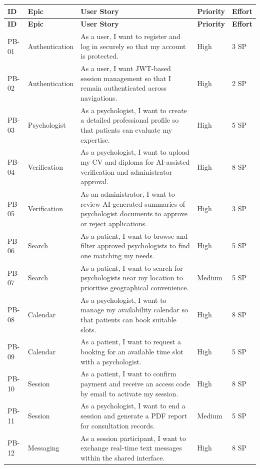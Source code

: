 \documentclass[a4paper,12pt]{report}
\begin{document}
\footnotesize
\begin{longtable}{@{} L{1.1cm} L{2.7cm} L{7.2cm} L{1.8cm} L{1.6cm} @{}}
\toprule
\bfseries ID &
\bfseries Epic &
\bfseries User Story &
\bfseries Priority &
\bfseries Effort \\
\midrule
\endfirsthead
\toprule
\bfseries ID &
\bfseries Epic &
\bfseries User Story &
\bfseries Priority &
\bfseries Effort \\
\midrule
\endhead

PB-01 & Authentication & As a user, I want to register and log in securely so that my account is protected. & High & 3 SP \\
\midrule
PB-02 & Authentication & As a user, I want JWT-based session management so that I remain authenticated across navigations. & High & 2 SP \\
\midrule
PB-03 & Psychologist & As a psychologist, I want to create a detailed professional profile so that patients can evaluate my expertise. & High & 5 SP \\
\midrule
PB-04 & Verification & As a psychologist, I want to upload my CV and diploma for AI-assisted verification and administrator approval. & High & 8 SP \\
\midrule
PB-05 & Verification & As an administrator, I want to review AI-generated summaries of psychologist documents to approve or reject applications. & High & 3 SP \\
\midrule
PB-06 & Search & As a patient, I want to browse and filter approved psychologists to find one matching my needs. & High & 5 SP \\
\midrule
PB-07 & Search & As a patient, I want to search for psychologists near my location to prioritise geographical convenience. & Medium & 5 SP \\
\midrule
PB-08 & Calendar & As a psychologist, I want to manage my availability calendar so that patients can book suitable slots. & High & 8 SP \\
\midrule
PB-09 & Calendar & As a patient, I want to request a booking for an available time slot with a psychologist. & High & 5 SP \\
\midrule
PB-10 & Session & As a patient, I want to confirm payment and receive an access code by email to activate my session. & High & 8 SP \\
\midrule
PB-11 & Session & As a psychologist, I want to end a session and generate a PDF report for consultation records. & Medium & 5 SP \\
\midrule
PB-12 & Messaging & As a session participant, I want to exchange real-time text messages within the shared interface. & High & 8 SP \\

\end{longtable}
\end{document}
